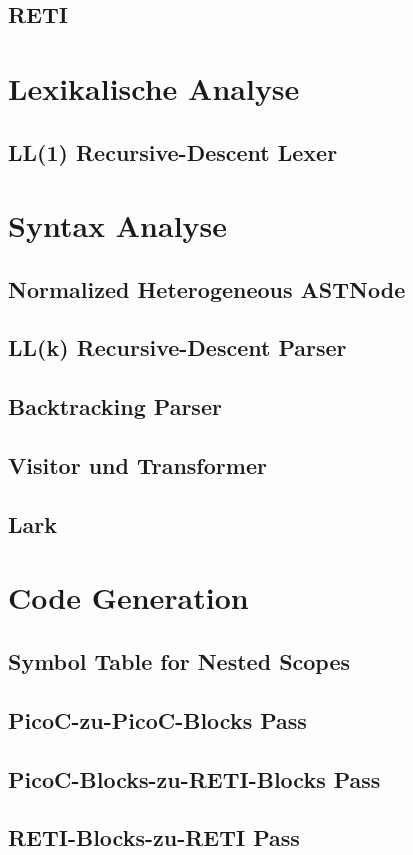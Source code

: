 \documentclass{scrreprt}
\begin{document}
  \subsection{RETI}
  \section{Lexikalische Analyse}
  \subsection{LL(1) Recursive-Descent Lexer}
  \section{Syntax Analyse}
  \subsection{Normalized Heterogeneous ASTNode}
  \subsection{LL(k) Recursive-Descent Parser}
  \subsection{Backtracking Parser}
  \subsection{Visitor und Transformer}
  \subsection{Lark}
  \section{Code Generation}
  \subsection{Symbol Table for Nested Scopes}
  \subsection{PicoC-zu-PicoC-Blocks Pass}
  \subsection{PicoC-Blocks-zu-RETI-Blocks Pass}
  \subsection{RETI-Blocks-zu-RETI Pass}
\end{document}
